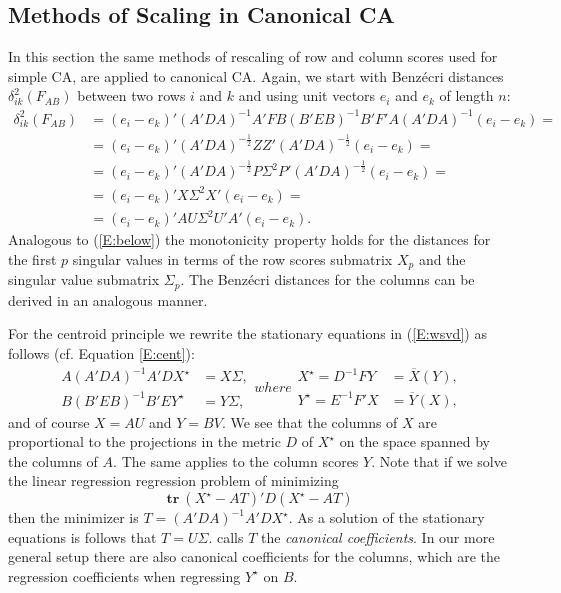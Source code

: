 \documentclass[article]{Z}
\begin{document}
\subsection{Methods of Scaling in Canonical CA}
\label{sec:scalecca}
In this section the same methods of rescaling of row and column scores used for simple CA, are applied to canonical CA. 
Again, we start with Benz\'ecri distances $\delta_{ik}^2\left(F_{AB}\right)$ between two rows $i$ and $k$ and using unit vectors $e_i$ and $e_k$ of length $n$: 
\begin{align*}
\delta_{ik}^2\left(F_{AB}\right)&=(e_i-e_k)'(A'DA)^{-1}A'FB(B'EB)^{-1}B'F'A(A'DA)^{-1}(e_i-e_k)=\\
&=(e_i-e_k)'(A'DA)^{-\frac12}ZZ'(A'DA)^{-\frac12}(e_i-e_k)=\\
&=(e_i-e_k)'(A'DA)^{-\frac12}P\Sigma^2P'(A'DA)^{-\frac12}(e_i-e_k)=\\
&=(e_i-e_k)'X\Sigma^2X'(e_i-e_k)=\\
&=(e_i-e_k)'AU\Sigma^2U'A'(e_i-e_k).
\end{align*}
Analogous to (\ref{E:below}) the monotonicity property holds for the distances for the first $p$ singular values in terms of the row scores submatrix $X_p$ and the singular value submatrix $\Sigma_p$. The Benz\'ecri distances for the columns can be derived in an analogous manner. 

For the centroid principle we rewrite the stationary equations in (\ref{E:wsvd}) as follows (cf. Equation \ref{E:cent}): 
\begin{subequations}
\begin{align}
A(A'DA)^{-1}A'DX^\star&=X\Sigma,\label{E:sub}\\
B(B'EB)^{-1}B'EY^\star&=Y\Sigma,
\end{align}
where
\begin{align}
X^\star=D^{-1}FY&=\overline{X}(Y),\\
Y^\star=E^{-1}F'X&=\overline{Y}(X),
\end{align}
\end{subequations}
and of course \(X=AU\) and \(Y=BV\). We see that the columns of \(X\)
are proportional to the projections in the metric \(D\) of \(X^\star\) on 
the space spanned by  the columns of \(A\). The same applies to the column scores \(Y\). Note that if we solve the linear regression regression problem of minimizing
\begin{equation}
\mathbf{tr}\ (X^\star-AT)'D(X^\star-AT)
\end{equation}
then the minimizer is \(T=(A'DA)^{-1}A'DX^\star\). As a solution of the 
stationary equations is follows that \(T=U\Sigma\). \citet{TerBraak:86} calls \(T\) the \emph{canonical coefficients}. In our more general setup there are also canonical coefficients for the columns, which are the regression coefficients when regressing \(Y^\star\) on \(B\).
\end{document}

